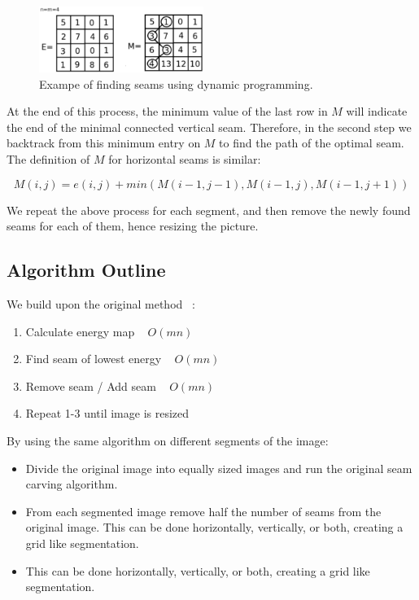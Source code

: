 \documentclass[conference]{acmsiggraph}
\begin{document}
\begin{figure}[ht]
  \centering
  \includegraphics[width=2.1in]{images/seam_alg}
  \caption{ Exampe of finding seams using dynamic programming.}
  \label{fig:seamAlg}
\end{figure}


At the end of this process, the minimum value of the last row in $M$ will indicate the end of the minimal connected vertical seam. Therefore, in the second step we backtrack from this minimum entry on $M$ to find the path of the optimal seam. The definition of $M$ for horizontal seams is similar:

\begin{equation}
M(i,j) = e(i,j) + min( M(i-1,j-1), M(i-1,j), M(i-1,j+1) )
\end{equation}

We repeat the above process for each segment, and then remove the newly found seams for each of them, hence resizing the picture.

\subsection{Algorithm Outline}

We build upon the original method ~\cite{Avidan2007}:
\begin{enumerate}
  \item Calculate energy map ~ $O(m n)$
  \item Find seam of lowest energy ~ $O(m n)$
  \item Remove seam / Add seam ~ $O(m n)$
  \item Repeat 1-3 until image is resized
\end{enumerate}

By using the same algorithm on different segments of the image:

\begin{itemize}
  \item Divide the original image into equally sized images and run the original seam carving algorithm.
  \item From each segmented image remove half the number of seams from the original image. This can be done horizontally, vertically, or both, creating a grid like segmentation.
  \item This can be done horizontally, vertically, or both, creating a grid like segmentation.
\end{itemize}
\end{document}
